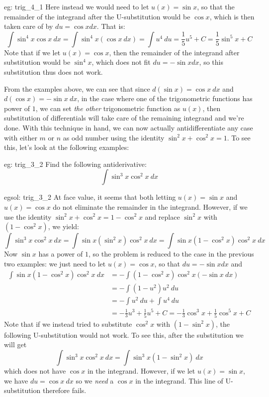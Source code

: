 \begin{exsol}[]{eg: trig_4_1}
    Here instead we would need to let $u(x) = \sin x$, so that the remainder of the integrand after the U-substitution would be $\cos x$, which is then taken care of by $du = \cos x dx$.  That is:
\begin{equation*}
    \int \sin^4 x \cos x~dx = \int \sin^4 x (\cos x~dx) = \int u^4~du = \frac{1}{5}u^5 + C = \frac{1}{5}\sin^5 x + C
\end{equation*}
    Note that if we let $u(x) = \cos x$, then the remainder of the integrand after substitution would be $\sin^4 x$, which does not fit $du = -\sin x dx$, so this substitution thus does not work.
\end{exsol}
From the examples above, we can see that since $d (\sin x) = \cos x~dx$ and $d (\cos x) = -\sin x~dx$, in the case where one of the trigonometric functions has power of $1$, we can set \textit{the other} trigonometric function as $u(x)$, then substitution of differentials will take care of the remaining integrand and we're done.  With this technique in hand, we can now actually antidifferentiate any case with either $m$ or $n$ as odd number using the identity $\sin^2 x + \cos^2x = 1$.  To see this, let's look at the following examples:
\begin{eg}[]{eg: trig_3_2}
Find the following antiderivative:
\[\int \sin^3 x \cos^2 x~dx\]
\end{eg}
\begin{egsol}[]{egsol: trig_3_2}
    At face value, it seems that both letting $u(x)=\sin x$ and $u(x)=\cos x$ do not eliminate the remainder in the integrand.  However, if we use the identity $\sin^2 x + \cos^2 x = 1- \cos^2 x$ and replace $\sin^2 x$ with $(1 - \cos^2 x)$, we yield:
    \[\int \sin^3 x \cos^2x~dx = \int \sin x (\sin^2 x) \cos^2 x~dx = \int \sin x (1 - \cos^2 x) \cos^2 x~dx\]
    Now $\sin x$ has a power of $1$, so the problem is reduced to the case in the previous two examples: we just need to let $u(x) = \cos x$, so that $du = -\sin x dx$ and
    \begin{align*}
        \int \sin x (1 - \cos^2 x) \cos^2 x~dx &= -\int (1-\cos^2 x) \cos^2 x (-\sin x~dx)\\
        &= -\int (1-u^2)u^2~du\\
        &= -\int u^2~du + \int u^4~du\\
        &= -\frac{1}{3}u^3 + \frac{1}{5}u^5 + C = -\frac{1}{3}\cos^3 x + \frac{1}{5} \cos^5 x + C
    \end{align*}
    Note that if we instead tried to substitute $\cos^2 x$ with $(1-\sin^2 x)$, the following U-substitution would not work.  To see this, after the substitution we will get
    \[\int \sin^3 x \cos^2x~dx = \int \sin^3 x (1-\sin^2 x)~dx\]
    which does not have $\cos x$ in the integrand.  However, if we let $u(x) = \sin x$, we have $du = \cos x~dx$ so we \textit{need} a $\cos x$ in the integrand.  This line of U-substitution therefore fails.
\end{egsol}
